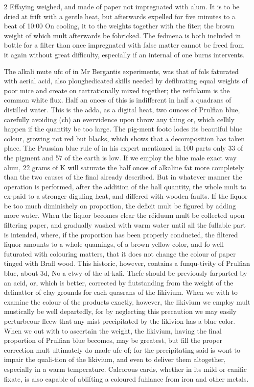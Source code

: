 \documentclass[10pt]{article}
\begin{document}
\begin{multicols}{2}\raggedcolumns
Effaying weighed, and made of paper not impregnated with alum. It is to be dried at frift with a gentle heat, but afterwards expelled for five minutes to a beat of 10:00 On cooling, it to the weights together with the fiter; the brown weight of which mult afterwards be fobricked. The fedmena is both included in bottle for a filter than once impregnated with false matter cannot be freed from it again without great difficulty, especially if an internal of one burns intervents.

The alkali mute ufc of in Mr Bergantis experiments, was that of fols faturated with aerial acid, also ploughedicated skills needed by defibrating equal weights of poor mice and create on tartrationally mixed together; the reifulaum is the common white flux. Half an onces of this is indifferent in half a quadrans of distilled water. This is the adda, as a digital heat, two ounces of Prulfian blue, carefully avoiding (ch) an evervidence upon throw any thing or, which cellily happen if the quantity be too large. The pig-ment footo lodes its beautiful blue colour, growing not red but blacks, which shows that a decomposition has taken place. The Prussian blue rule of in his expert mentioned in 100 parts only 33 of the pigment and 57 of the earth is low. If we employ the blue male exact way alum, 22 grams of K will saturate the half onces of alkaline fat more completely than the two causes of the final already described. But in whatever manner the operation is performed, after the addition of the hall quantity, the whole mult to ex-paid to a stronger diguling heat, and differed with wooden faults. If the liquor be too much diminishely on proportion, the deficit mult be figured by adding more water. When the liquor becomes clear the réiduum mult be collected upon filtering paper, and gradually washed with warm water until all the fullable part is intended, where, if the proportion has been properly conducted, the filtered liquor amounts to a whole quamings, of a brown yellow color, and fo well futurated with colouring matters, that it does not change the colour of paper tinged with Brafl wood. This historic, however, contains a funqu-tivity of Prulfian blue, about 3d, No a ctwy of the al-kali. Thefe should be previously farparted by an acid, or, which is better, corrected by flutstanding from the weight of the delinattor of clay grounds for each quasrans of the likivium. When we with to examine the colour of the products exactly, however, the likivium we employ mult mustically be well departedly, for by neglecting this precaution we may easily perturbeour-fleew that any mist precipitated by the likivion has a blue color. When we out with to ascertain the weight, the likivium, having the final proportion of Prulfian blue becomes, may be greatest, but fill the proper correction mult ultimately do made ufc of; for the precipitating said is wont to impair the quali-tion of the likivium, and even to deliver them altogether, especially in a warm temperature. Calcorous cards, whether in its mild or canific fixate, is also capable of ablifting a coloured fuhlance from iron and other metals.


\end{multicols}
\end{document}
